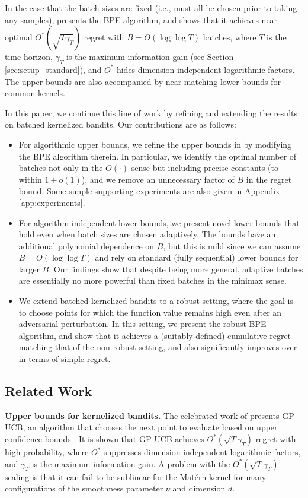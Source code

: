 \documentclass[10pt]{article}
\begin{document}
In the case that the batch sizes are fixed (i.e., must all be chosen prior to taking any samples), \citep{Li22} presents the BPE algorithm, and shows that it achieves near-optimal $O^*(\sqrt{T\gamma_T})$ regret with $B=O(\log\log T)$ batches, where $T$ is the time horizon, $\gamma_T$ is the maximum information gain (see Section \ref{sec:setup_standard}), and $O^*$ hides dimension-independent logarithmic factors. The upper bounds are also accompanied by near-matching lower bounds for common kernels.

In this paper, we continue this line of work by refining and extending the results on batched kernelized bandits. 
Our contributions are as follows:
\begin{itemize}
    \item For algorithmic upper bounds, we refine the upper bounds in \citep{Li22} by modifying the BPE algorithm therein. 
    In particular, we identify the optimal number of batches not only in the $O(\cdot)$ sense but including precise constants (to within $1+o(1)$), and we remove an unnecessary factor of $B$ in the regret bound.  Some simple supporting experiments are also given in Appendix \ref{app:experiments}.
    \item For algorithm-independent lower bounds, we present novel lower bounds that hold even when batch sizes are chosen adaptively. 
    The bounds have an additional polynomial dependence on $B$, but this is mild since we can assume $B=O(\log\log T)$ and rely on standard (fully sequential) lower bounds for larger $B$.  Our findings show that despite being more general, adaptive batches are essentially no more powerful than fixed batches in the minimax sense.
    \item We extend batched kernelized bandits to a robust setting, where the goal is to choose points for which the function value remains high even after an adversarial perturbation. In this setting, we present the robust-BPE algorithm, and show that it achieves a (suitably defined) cumulative regret matching that of the non-robust setting, and also significantly improves over \citep{Bogunovic18} in terms of simple regret.
\end{itemize}

\subsection{Related Work} \label{sec:related}

\textbf{Upper bounds for kernelized bandits.} The celebrated work of \cite{Srinivas10} presents GP-UCB, an algorithm that chooses the next point to evaluate based on upper confidence bounds \citep{Auer02, Auer02b, Dani08}. It is shown that GP-UCB achieves $O^*(\sqrt{T}\gamma_T)$ regret with high probability, where $O^*$ suppresses dimension-independent logarithmic factors, and $\gamma_T$ is the maximum information gain. A problem with the $O^*(\sqrt{T}\gamma_T)$ scaling is that it can fail to be sublinear for the Mat\'ern kernel for many configurations of the smoothness parameter $\nu$ and dimension $d$.
\end{document}
